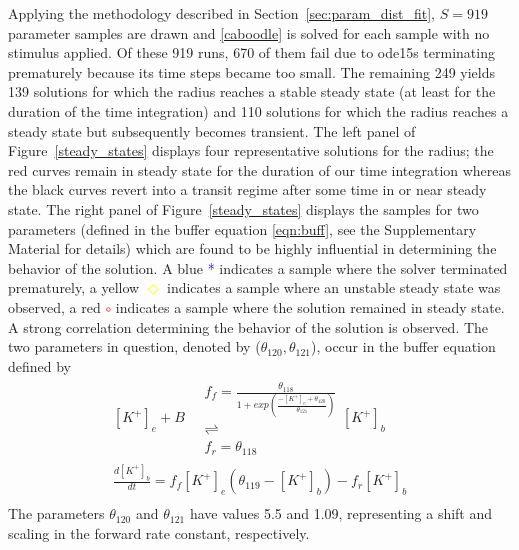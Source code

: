 \documentclass[smallextended]{svjour3}
\numberwithin{equation}{section}
\begin{document}
Applying the methodology described in Section~\ref{sec:param_dist_fit}, $S=919$ parameter samples are drawn and \eqref{caboodle} is solved for each sample with no stimulus applied. Of these 919 runs, 670 of them fail due to ode15s terminating prematurely because its time steps became too small. The remaining 249 yields 139 solutions for which the radius reaches a stable steady state (at least for the duration of the time integration) and 110 solutions for which the radius reaches a steady state but subsequently becomes transient. The left panel of Figure~\ref{steady_states} displays four representative solutions for the radius; the red curves remain in steady state for the duration of our time integration whereas the black curves revert into a transit regime after some time in or near steady state. The right panel of Figure~\ref{steady_states} displays the samples for two parameters (defined in the buffer equation \eqref{eqn:buff}, see the Supplementary Material for details) which are found to be highly influential in determining the behavior of the solution. A blue \textcolor{blue}{*} indicates a sample where the solver terminated prematurely, a yellow \textcolor{yellow}{$\Diamond$} indicates a sample where an unstable steady state was observed, a red \textcolor{red}{$\circ$} indicates a sample where the solution remained in steady state. A strong correlation determining the behavior of the solution is observed. The two parameters in question, denoted by ($\theta_{120},\theta_{121}$), occur in the buffer equation defined by
\begin{eqnarray}\label{eqn:buff}
[K^+]_e+B \quad\begin{array}{c}
f_f =\frac{\theta_{118}}{1+exp(\frac{-[K^+]_e+\theta_{120}}{\theta_{121}})}\\ 
 \rightleftharpoons \\
f_r=\theta_{118}
\end{array} 
[K^+]_b \nonumber \\
\frac{d[K^+]_b}{dt}=f_f[K^+]_e(\theta_{119}-[K^+]_b)-f_r[K^+]_b \nonumber \\
\end{eqnarray}
The parameters $\theta_{120}$ and $\theta_{121}$ have values 5.5 and 1.09, representing a shift and scaling in the forward rate constant, respectively. 
\end{document}
